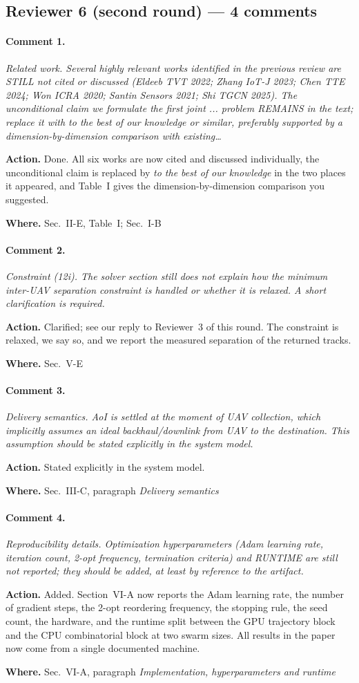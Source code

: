 \documentclass[10pt]{article}
\newcommand{\rev}[1]{\par\medskip\noindent\textit{#1}\par\smallskip}
\newcommand{\act}[2]{\noindent\textbf{Action.} #1\par\noindent\textbf{Where.} #2\par}
\begin{document}
\subsection*{Reviewer 6 (second round) --- 4 comments}

\paragraph{Comment 1.}
\rev{Related work. Several highly relevant works identified in the previous review are STILL not cited or discussed (Eldeeb TVT 2022; Zhang IoT-J 2023; Chen TTE 2024; Won ICRA 2020; Santin Sensors 2021; Shi TGCN 2025). The unconditional claim we formulate the first joint ... problem REMAINS in the text; replace it with to the best of our knowledge or similar, preferably supported by a dimension-by-dimension comparison with existing\dots}
\act{Done. All six works are now cited and discussed individually, the unconditional claim is replaced by \emph{to the best of our knowledge} in the two places it appeared, and Table~I gives the dimension-by-dimension comparison you suggested.}{Sec.~II-E, Table~I; Sec.~I-B}

\paragraph{Comment 2.}
\rev{Constraint (12i). The solver section still does not explain how the minimum inter-UAV separation constraint is handled or whether it is relaxed. A short clarification is required.}
\act{Clarified; see our reply to Reviewer~3 of this round. The constraint is relaxed, we say so, and we report the measured separation of the returned tracks.}{Sec.~V-E}

\paragraph{Comment 3.}
\rev{Delivery semantics. AoI is settled at the moment of UAV collection, which implicitly assumes an ideal backhaul/downlink from UAV to the destination. This assumption should be stated explicitly in the system model.}
\act{Stated explicitly in the system model.}{Sec.~III-C, paragraph \emph{Delivery semantics}}

\paragraph{Comment 4.}
\rev{Reproducibility details. Optimization hyperparameters (Adam learning rate, iteration count, 2-opt frequency, termination criteria) and RUNTIME are still not reported; they should be added, at least by reference to the artifact.}
\act{Added. Section~VI-A now reports the Adam learning rate, the number of gradient steps, the 2-opt reordering frequency, the stopping rule, the seed count, the hardware, and the runtime split between the GPU trajectory block and the CPU combinatorial block at two swarm sizes. All results in the paper now come from a single documented machine.}{Sec.~VI-A, paragraph \emph{Implementation, hyperparameters and runtime}}
\end{document}
